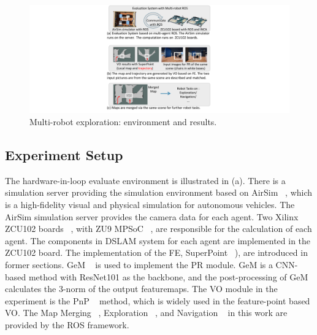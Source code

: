\label{sec:experiments}


\begin{figure}[t]
  \centering
  \includegraphics[width=0.8\linewidth]{fig/env.pdf}
  \caption{Multi-robot exploration: environment and results. }
  \label{fig:env}
\end{figure}





\subsection{ Experiment Setup }

The hardware-in-loop evaluate environment is illustrated in (a). There is a simulation server providing the simulation environment based on AirSim  ~\cite{shah2018airsim}, which is a high-fidelity visual and physical simulation for autonomous vehicles. The AirSim simulation server provides the camera data for each agent. Two Xilinx ZCU102 boards  ~\cite{zcu102}, with ZU9 MPSoC  ~\cite{MPSoC}, are responsible for the calculation of each agent. 
The components in DSLAM system for each agent are implemented in the ZCU102 board. The implementation of the FE, SuperPoint ~\cite{detone2018superpoint}), are introduced in former sections. 
GeM  ~\cite{radenovic2018fine} is used to implement the PR module. GeM is a CNN-based method with ResNet101 \cite{he2016deep} as the backbone, and the post-processing of GeM calculates the 3-norm of the output featuremaps.
The VO module in the experiment is the PnP  ~\cite{LepetitMoreno-Noguer-EPnP} method, which is widely used in the feature-point based VO. 
The Map Merging  ~\cite{Andre2014}, Exploration  ~\cite{8202319}, and Navigation  ~\cite{tbd} in this work are provided by the ROS framework. 

